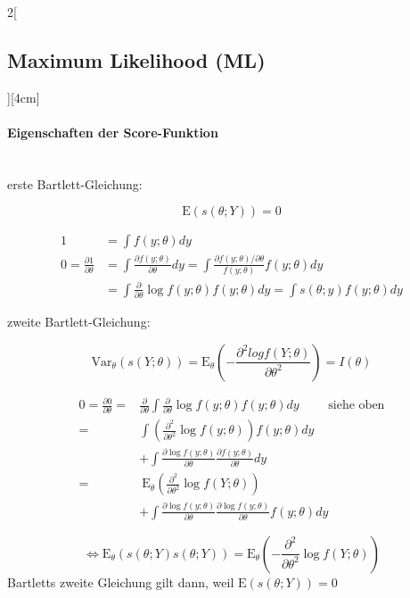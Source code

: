 \documentclass[8pt]{extarticle}
\begin{document}
\begin{multicols}{2}[\subsection{Maximum Likelihood (ML)}][4cm]
  
  \paragraph{Eigenschaften der Score-Funktion} \ \\
  
  erste Bartlett-Gleichung:
  
  $$\mathrm{E}\left(s(\theta;Y)\right) = 0$$
  
\begin{Beweis}
\vspace{-1.5em}
\begin{align*}
1 &= \int f(y;\theta) dy \\
0 = \frac{\partial 1}{\partial\theta} &= \int \frac{\partial f(y;\theta)}{\partial \theta}dy = \int \frac{\partial f(y;\theta) / \partial\theta}{f(y;\theta)} f(y;\theta) dy \\ &= \int \frac{\partial}{\partial\theta} \log f(y;\theta) f(y;\theta) dy = \int s(\theta;y) f(y;\theta) dy
\end{align*}
\end{Beweis}
  
  zweite Bartlett-Gleichung:
  
  $$\mathrm{Var}_\theta\left(s(Y;\theta)\right) = \mathrm{E}_\theta\left(-\frac{\partial^2 log f(Y;\theta)}{\partial\theta^2}\right) = I(\theta)$$
  
\begin{Beweis}
\vspace{-1.5em}

\begin{align*}
0 = \frac{\partial 0}{\partial \theta} =& \frac{\partial}{\partial\theta}\int \frac{\partial}{\partial\theta} \log f(y;\theta) f(y;\theta) dy \hspace{2em}\text{      siehe oben}\\
=& \int \left( \frac{\partial^2}{\partial \theta^2} \log f(y;\theta)\right) f(y;\theta) dy  \\
&+ \int\frac{\partial \log f(y;\theta)}{\partial \theta}\frac{\partial f(y;\theta)}{\partial \theta}dy \\
=& \: \mathrm{E}_\theta \left( \frac{\partial^2}{\partial \theta^2} \log f(Y;\theta)\right)  \\
&+ \int\frac{\partial \log f(y;\theta)}{\partial \theta}\frac{\partial \log f(y;\theta)}{\partial \theta} f(y;\theta) dy 
\end{align*}

$$\Leftrightarrow \mathrm{E}_\theta \left(s(\theta;Y) s(\theta;Y)\right) = \mathrm{E}_\theta \left(- \frac{\partial^2}{\partial \theta^2} \log f(Y;\theta)\right)$$
\noindent Bartletts zweite Gleichung gilt dann, weil $\mathrm{E}\left(s(\theta;Y)\right) = 0$
\end{Beweis}
  

\end{multicols}
\end{document}
